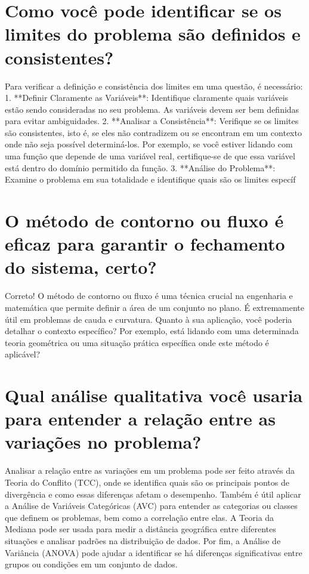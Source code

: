 \documentclass[11pt,a4paper]{article}
\begin{document}
\section{Como você pode identificar se os limites do problema são definidos e consistentes?}
Para verificar a definição e consistência dos limites em uma questão, é necessário: 1. **Definir Claramente as Variáveis**: Identifique claramente quais variáveis estão sendo consideradas no seu problema. As variáveis devem ser bem definidas para evitar ambiguidades. 2. **Analisar a Consistência**: Verifique se os limites são consistentes, isto é, se eles não contradizem ou se encontram em um contexto onde não seja possível determiná-los. Por exemplo, se você estiver lidando com uma função que depende de uma variável real, certifique-se de que essa variável está dentro do domínio permitido da função. 3. **Análise do Problema**: Examine o problema em sua totalidade e identifique quais são os limites específ

\section{O método de contorno ou fluxo é eficaz para garantir o fechamento do sistema, certo?}
Correto! O método de contorno ou fluxo é uma técnica crucial na engenharia e matemática que permite definir a área de um conjunto no plano. É extremamente útil em problemas de cauda e curvatura. Quanto à sua aplicação, você poderia detalhar o contexto específico? Por exemplo, está lidando com uma determinada teoria geométrica ou uma situação prática específica onde este método é aplicável?

\section{Qual análise qualitativa você usaria para entender a relação entre as variações no problema?}
Analisar a relação entre as variações em um problema pode ser feito através da Teoria do Conflito (TCC), onde se identifica quais são os principais pontos de divergência e como essas diferenças afetam o desempenho. Também é útil aplicar a Análise de Variáveis Categóricas (AVC) para entender as categorias ou classes que definem os problemas, bem como a correlação entre elas. A Teoria da Mediana pode ser usada para medir a distância geográfica entre diferentes situações e analisar padrões na distribuição de dados. Por fim, a Análise de Variância (ANOVA) pode ajudar a identificar se há diferenças significativas entre grupos ou condições em um conjunto de dados.
\end{document}
